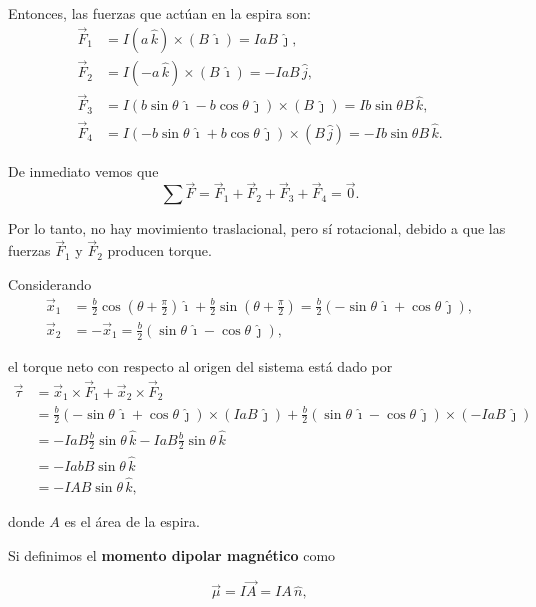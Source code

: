 Entonces, las fuerzas que actúan en la espira son:
\begin{align*}
 \vec{F}_1 &= I (a \,\hat{k}) \times (B \,\hat{\imath}) = IaB \,\hat{\jmath}, \\
\vec{F}_2 &= I (-a \,\hat{k}) \times (B\, \hat{\imath}) = -IaB \,\hat{j}, \\
\vec{F}_3 &= I (b \sin\theta \,\hat{\imath} - b \cos\theta \,\hat{\jmath}) \times (B \,\hat{\jmath}) = Ib \sin \theta B \,\hat{k}, \\
\vec{F}_4 &= I (-b \sin \theta \,\hat{\imath} + b \cos \theta \,\hat{\jmath}) \times (B\, \hat{j}) = -Ib \sin \theta B \,\hat{k}.   
\end{align*}

De inmediato vemos que
$$\sum \vec{F} = \vec{F}_1 + \vec{F}_2 + \vec{F}_3 + \vec{F}_4 = \vec{0}.$$

Por lo tanto, no hay movimiento traslacional, pero sí rotacional, debido a que las fuerzas $\vec{F}_1$ y $\vec{F}_2$ producen torque.

Considerando
\begin{align*}
\vec{x}_1 &= \frac{b}{2} \cos \left( \theta + \frac{\pi}{2} \right) \hat{\imath} + \frac{b}{2} \sin \left(\theta + \frac{\pi}{2} \right) = \frac{b}{2} (- \sin \theta \,\hat{\imath} + \cos\theta \,\hat{\jmath}), \\
\vec{x}_2 &= - \vec{x}_1 = \frac{b}{2} (\sin \theta \,\hat{\imath} - \cos\theta \,\hat{\jmath}),    
\end{align*}

el torque neto con respecto al origen del sistema está dado por
\begin{align*}
\vec{\tau} &= \vec{x}_1 \times \vec{F}_1 + \vec{x}_2 \times \vec{F}_2 \\
&= \frac{b}{2} (- \sin \theta \,\hat{\imath} + \cos\theta \,\hat{\jmath}) \times (IaB \,\hat{\jmath}) +\frac{b}{2} (\sin \theta \,\hat{\imath} - \cos\theta \,\hat{\jmath}) \times (-IaB \,\hat{\jmath}) \\
&= -IaB \frac{b}{2} \sin \theta\, \hat{k} - IaB \frac{b}{2} \sin \theta \,\hat{k} \\
&= - IabB \sin \theta \,\hat{k} \\
&= -I AB \sin \theta \,\hat{k},    
\end{align*}


donde $A$ es el área de la espira.

Si definimos el \textbf{momento dipolar magnético} como 
\begin{shaded}
    $$\Vec{\mu} = I \vec{A} = IA \,\hat{n},$$
\end{shaded}

